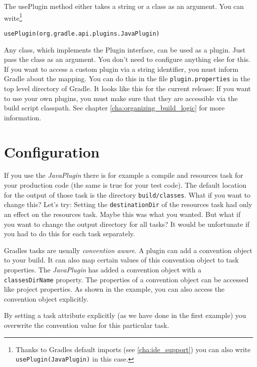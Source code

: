 \noindent The usePlugin method either takes a string or a class as an argument. You can write\footnote{Thanks to Gradles default imports (see \ref{cha:ide_support}) you can also write \texttt{usePlugin(JavaPlugin)} in this case.}
\begin{Verbatim}
usePlugin(org.gradle.api.plugins.JavaPlugin)
\end{Verbatim} 
Any class, which implements the Plugin interface, can be used as a plugin. Just pass the class as an argument. You don't need to configure anything else for this. If you want to access a custom plugin via a string identifier, you must inform Gradle about the mapping. You can do this in the file \texttt{plugin.properties} in the top level directory of Gradle. It looks like this for the current release:
If you want to use your own plugins, you must make sure that they are accessible via the build script classpath. See chapter \ref{cha:organizing_build_logic} for more information.

\section{Configuration} %
If you use the \emph{JavaPlugin} there is for example a compile and resources task for your production code (the same is true for your test code). The default location for the output of those task is the directory \texttt{build/classes}. What if you want to change this? Let's try:
Setting the \texttt{destinationDir} of the resources task had only an effect on the resources task. Maybe this was what you wanted. But what if you want to change the output directory for all tasks? It would be unfortunate if you had to do this for each task separately. 

Gradles tasks are usually \emph{convention aware}. A plugin can add a convention object to your build. It can also map certain values of this convention object to task properties.
The \emph{JavaPlugin} has added a convention object with a \texttt{classesDirName} property. The properties of a convention object can be accessed like project properties. As shown in the example, you can also access the convention object explicitly.

By setting a task attribute explicitly (as we have done in the first example) you overwrite the convention value for this particular task.

